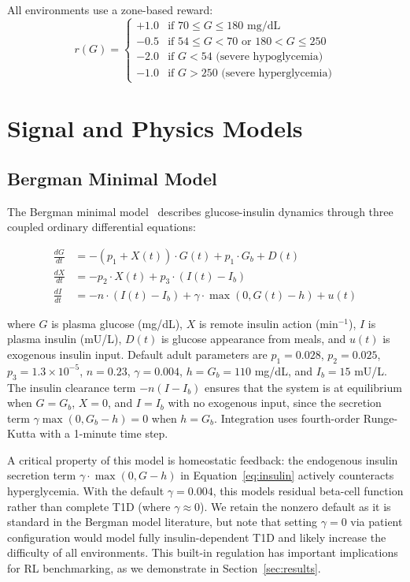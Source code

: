 \documentclass[11pt]{article}
\begin{document}
All environments use a zone-based reward:
\begin{equation}
r(G) = \begin{cases}
+1.0 & \text{if } 70 \leq G \leq 180 \text{ mg/dL} \\
-0.5 & \text{if } 54 \leq G < 70 \text{ or } 180 < G \leq 250 \\
-2.0 & \text{if } G < 54 \text{ (severe hypoglycemia)} \\
-1.0 & \text{if } G > 250 \text{ (severe hyperglycemia)}
\end{cases}
\end{equation}

\section{Signal and Physics Models}

\subsection{Bergman Minimal Model}

The Bergman minimal model~\citep{bergman1979quantitative} describes glucose-insulin dynamics through three coupled ordinary differential equations:

\begin{align}
\frac{dG}{dt} &= -(p_1 + X(t)) \cdot G(t) + p_1 \cdot G_b + D(t) \label{eq:glucose} \\
\frac{dX}{dt} &= -p_2 \cdot X(t) + p_3 \cdot (I(t) - I_b) \label{eq:insulin_action} \\
\frac{dI}{dt} &= -n \cdot (I(t) - I_b) + \gamma \cdot \max(0, G(t) - h) + u(t) \label{eq:insulin}
\end{align}

where $G$ is plasma glucose (mg/dL), $X$ is remote insulin action (min$^{-1}$), $I$ is plasma insulin (mU/L), $D(t)$ is glucose appearance from meals, and $u(t)$ is exogenous insulin input. Default adult parameters are $p_1 = 0.028$, $p_2 = 0.025$, $p_3 = 1.3 \times 10^{-5}$, $n = 0.23$, $\gamma = 0.004$, $h = G_b = 110$ mg/dL, and $I_b = 15$ mU/L. The insulin clearance term $-n(I - I_b)$ ensures that the system is at equilibrium when $G = G_b$, $X = 0$, and $I = I_b$ with no exogenous input, since the secretion term $\gamma \max(0, G_b - h) = 0$ when $h = G_b$. Integration uses fourth-order Runge-Kutta with a 1-minute time step.

A critical property of this model is homeostatic feedback: the endogenous insulin secretion term $\gamma \cdot \max(0, G - h)$ in Equation~\ref{eq:insulin} actively counteracts hyperglycemia. With the default $\gamma = 0.004$, this models residual beta-cell function rather than complete T1D (where $\gamma \approx 0$). We retain the nonzero default as it is standard in the Bergman model literature, but note that setting $\gamma = 0$ via patient configuration would model fully insulin-dependent T1D and likely increase the difficulty of all environments. This built-in regulation has important implications for RL benchmarking, as we demonstrate in Section~\ref{sec:results}.
\end{document}
